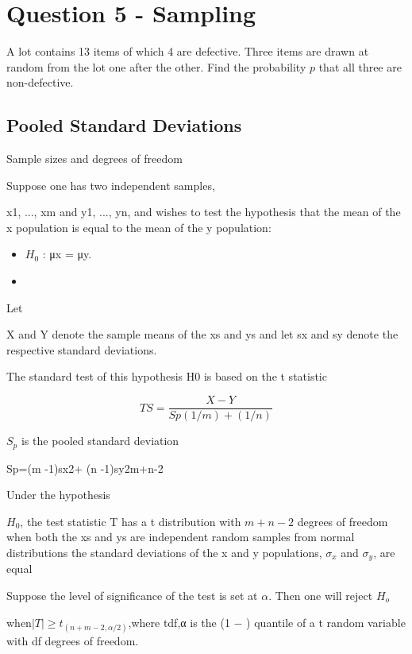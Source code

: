 \documentclass[]{report}
\begin{document}
\section*{Question 5 - Sampling}
A lot contains 13 items of which 4 are defective. Three items are drawn at random from the lot one after the other. Find the probability $p$ that all three are non-defective.

\subsection{Pooled Standard Deviations}

Sample sizes and degrees of freedom


Suppose one has two independent samples,

x1, ..., xm and y1, ..., yn, and wishes
to test the hypothesis that the mean of the
x population is equal to the mean
of the y population:

\begin{itemize}
\item $H_0$ : μx = μy.
\item 
\end{itemize}

Let

X and Y denote the sample means of the xs and ys and let sx and sy
denote the respective standard deviations.

The standard test of this hypothesis
H0 is based on the t statistic

\[TS =\frac{X-Y}{Sp(1/m )+ (1/n)}\]


$S_p$ is the pooled standard deviation


Sp=(m -1)sx2+ (n -1)sy2m+n-2

Under the hypothesis

$H_0$, the test statistic T has a t distribution with $m+n−2$
degrees of freedom when both the xs and ys are independent random samples from normal distributions the standard deviations of the x and y populations, $\sigma_x$ and $\sigma_y$, are equal

Suppose the level of significance of the test is set at $\alpha$. Then one will reject $H_o$

when$|T| ≥ t_{(n+m−2,\alpha/2)}$,where tdf,α is the (1 − ) quantile of a t random variable with df degrees of
freedom.
\end{document}
